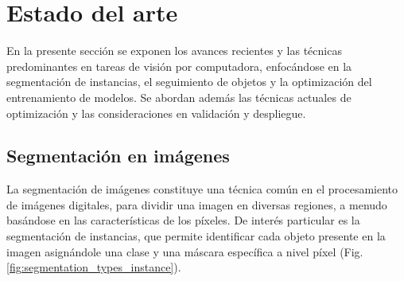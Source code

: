 \section{Estado del arte}
En la presente sección se exponen los avances recientes y las técnicas predominantes en tareas de visión por computadora, enfocándose en la segmentación de instancias, el seguimiento de objetos y la optimización del entrenamiento de modelos. Se abordan además las técnicas actuales de optimización y las consideraciones en validación y despliegue.%

\subsection{Segmentación en imágenes}
La segmentación de imágenes constituye una técnica común en el procesamiento de imágenes digitales, para dividir una imagen en diversas regiones, a menudo basándose en las características de los píxeles. De interés particular es la segmentación de instancias, que permite identificar cada objeto presente en la imagen asignándole una clase y una máscara específica a nivel píxel (Fig. \ref{fig:segmentation_types_instance}).

